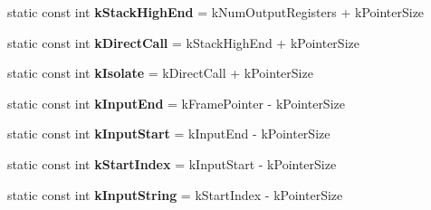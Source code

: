 \begin{DoxyCompactItemize}
\item 
static const int {\bfseries k\+Stack\+High\+End} = k\+Num\+Output\+Registers + k\+Pointer\+Size\hypertarget{classv8_1_1internal_1_1_reg_exp_macro_assembler_m_i_p_s_a309a260ac67d2336eae81fe262bdeb29}{}\label{classv8_1_1internal_1_1_reg_exp_macro_assembler_m_i_p_s_a309a260ac67d2336eae81fe262bdeb29}

\item 
static const int {\bfseries k\+Direct\+Call} = k\+Stack\+High\+End + k\+Pointer\+Size\hypertarget{classv8_1_1internal_1_1_reg_exp_macro_assembler_m_i_p_s_adb14b7ae991ce42a4a621557c1f85915}{}\label{classv8_1_1internal_1_1_reg_exp_macro_assembler_m_i_p_s_adb14b7ae991ce42a4a621557c1f85915}

\item 
static const int {\bfseries k\+Isolate} = k\+Direct\+Call + k\+Pointer\+Size\hypertarget{classv8_1_1internal_1_1_reg_exp_macro_assembler_m_i_p_s_a3fce4b25106052207d573bac840e0ad1}{}\label{classv8_1_1internal_1_1_reg_exp_macro_assembler_m_i_p_s_a3fce4b25106052207d573bac840e0ad1}

\item 
static const int {\bfseries k\+Input\+End} = k\+Frame\+Pointer -\/ k\+Pointer\+Size\hypertarget{classv8_1_1internal_1_1_reg_exp_macro_assembler_m_i_p_s_a2b99f181078e743e375f5dfa2a3b4f10}{}\label{classv8_1_1internal_1_1_reg_exp_macro_assembler_m_i_p_s_a2b99f181078e743e375f5dfa2a3b4f10}

\item 
static const int {\bfseries k\+Input\+Start} = k\+Input\+End -\/ k\+Pointer\+Size\hypertarget{classv8_1_1internal_1_1_reg_exp_macro_assembler_m_i_p_s_a4e2c27027c6ed25d8b0c82023bbd67f5}{}\label{classv8_1_1internal_1_1_reg_exp_macro_assembler_m_i_p_s_a4e2c27027c6ed25d8b0c82023bbd67f5}

\item 
static const int {\bfseries k\+Start\+Index} = k\+Input\+Start -\/ k\+Pointer\+Size\hypertarget{classv8_1_1internal_1_1_reg_exp_macro_assembler_m_i_p_s_ac16bf5421b2d0b8cbc232d9149f1173a}{}\label{classv8_1_1internal_1_1_reg_exp_macro_assembler_m_i_p_s_ac16bf5421b2d0b8cbc232d9149f1173a}

\item 
static const int {\bfseries k\+Input\+String} = k\+Start\+Index -\/ k\+Pointer\+Size\hypertarget{classv8_1_1internal_1_1_reg_exp_macro_assembler_m_i_p_s_a7ab687f05e1f3adcd436067c53a75b2a}{}\label{classv8_1_1internal_1_1_reg_exp_macro_assembler_m_i_p_s_a7ab687f05e1f3adcd436067c53a75b2a}


\end{DoxyCompactItemize}
